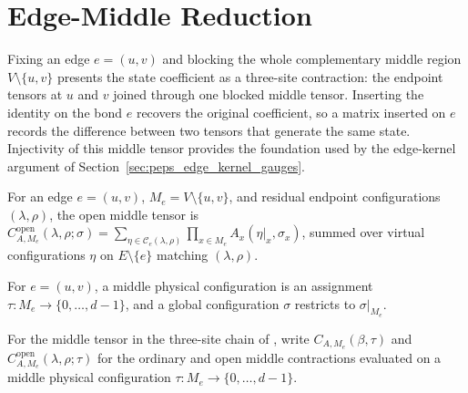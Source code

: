 \section{Edge-Middle Reduction}\label{sec:peps_edge_middle}

Fixing an edge $e=(u,v)$ and blocking the whole complementary middle region
$V\setminus\{u,v\}$ presents the state coefficient as a three-site contraction:
the endpoint tensors at $u$ and $v$ joined through one blocked middle tensor.
Inserting the identity on the bond $e$ recovers the original coefficient, so a
matrix inserted on $e$ records the difference between two tensors that generate
the same state. Injectivity of this middle tensor provides the foundation
used by the edge-kernel argument of Section~\ref{sec:peps_edge_kernel_gauges}.

\begin{definition}%
    \label{def:peps_edgeOpenMiddleWeight}
    \leanok
    For an edge $e=(u,v)$, $M_e=V\setminus\{u,v\}$, and residual endpoint
    configurations $(\lambda,\rho)$, the open middle tensor is
    $C^{\mathrm{open}}_{A,M_e}(\lambda,\rho;\sigma)
        =\sum_{\eta\in\mathcal C_e(\lambda,\rho)}\prod_{x\in M_e}A_x(\eta|_x,\sigma_x)$,
    summed over virtual configurations $\eta$ on $E\setminus\{e\}$ matching
    $(\lambda,\rho)$.
\end{definition}

\begin{definition}%
    \label{def:peps_edgeMiddlePhysicalConfig}
    \leanok
    For $e=(u,v)$, a middle physical configuration is an assignment
    $\tau:M_e\to\{0,\ldots,d-1\}$, and a global configuration $\sigma$
    restricts to $\sigma|_{M_e}$.
\end{definition}

\begin{definition}%
    \label{def:peps_edgeMiddleWeightOn}
    \leanok
    For the middle tensor in the three-site chain of
    \cite[Section~3]{Molnar2018NormalPEPS}, write
    $C_{A,M_e}(\beta,\tau)$ and $C^{\mathrm{open}}_{A,M_e}(\lambda,\rho;\tau)$
    for the ordinary and open middle contractions evaluated on a middle
    physical configuration $\tau:M_e\to\{0,\ldots,d-1\}$.
\end{definition}

